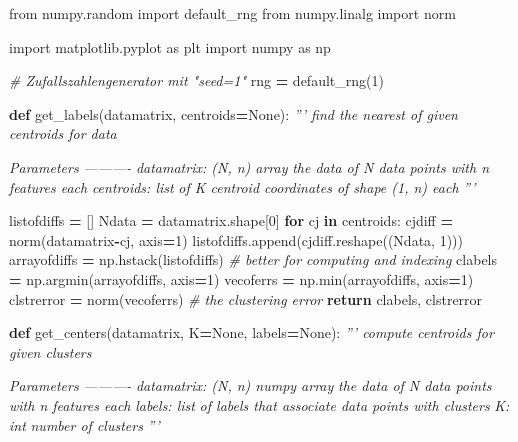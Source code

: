 \documentclass[]{book}
\newenvironment{Shaded}{\begin{snugshade}}{\end{snugshade}}
\newcommand{\BuiltInTok}[1]{#1}
\newcommand{\CommentTok}[1]{\textcolor[rgb]{0.56,0.35,0.01}{\textit{#1}}}
\newcommand{\ControlFlowTok}[1]{\textcolor[rgb]{0.13,0.29,0.53}{\textbf{#1}}}
\newcommand{\DecValTok}[1]{\textcolor[rgb]{0.00,0.00,0.81}{#1}}
\newcommand{\ImportTok}[1]{#1}
\newcommand{\KeywordTok}[1]{\textcolor[rgb]{0.13,0.29,0.53}{\textbf{#1}}}
\newcommand{\NormalTok}[1]{#1}
\newcommand{\OperatorTok}[1]{\textcolor[rgb]{0.81,0.36,0.00}{\textbf{#1}}}
\newcommand{\VariableTok}[1]{\textcolor[rgb]{0.00,0.00,0.00}{#1}}
\theoremstyle{definition}
\theoremstyle{definition}
\theoremstyle{definition}
\theoremstyle{definition}
\theoremstyle{remark}
\begin{document}
\begin{Shaded}
\begin{Highlighting}[]
\ImportTok{from}\NormalTok{ numpy.random }\ImportTok{import}\NormalTok{ default_rng}
\ImportTok{from}\NormalTok{ numpy.linalg }\ImportTok{import}\NormalTok{ norm}

\ImportTok{import}\NormalTok{ matplotlib.pyplot }\ImportTok{as}\NormalTok{ plt}
\ImportTok{import}\NormalTok{ numpy }\ImportTok{as}\NormalTok{ np}

\CommentTok{# Zufallszahlengenerator mit "seed=1"}
\NormalTok{rng }\OperatorTok{=}\NormalTok{ default_rng(}\DecValTok{1}\NormalTok{)}


\KeywordTok{def}\NormalTok{ get_labels(datamatrix, centroids}\OperatorTok{=}\VariableTok{None}\NormalTok{):}
    \CommentTok{''' find the nearest of given centroids for data}

\CommentTok{    Parameters}
\CommentTok{    ----------}
\CommentTok{    datamatrix: (N, n) array}
\CommentTok{        the data of N data points with n features each}
\CommentTok{    centroids: list}
\CommentTok{        of K centroid coordinates of shape (1, n) each}
\CommentTok{    '''}

\NormalTok{    listofdiffs }\OperatorTok{=}\NormalTok{ []}
\NormalTok{    Ndata }\OperatorTok{=}\NormalTok{ datamatrix.shape[}\DecValTok{0}\NormalTok{]}
    \ControlFlowTok{for}\NormalTok{ cj }\KeywordTok{in}\NormalTok{ centroids:}
\NormalTok{        cjdiff }\OperatorTok{=}\NormalTok{ norm(datamatrix}\OperatorTok{-}\NormalTok{cj, axis}\OperatorTok{=}\DecValTok{1}\NormalTok{)}
\NormalTok{        listofdiffs.append(cjdiff.reshape((Ndata, }\DecValTok{1}\NormalTok{)))}
\NormalTok{    arrayofdiffs }\OperatorTok{=}\NormalTok{ np.hstack(listofdiffs)  }\CommentTok{# better for computing and indexing}
\NormalTok{    clabels }\OperatorTok{=}\NormalTok{ np.argmin(arrayofdiffs, axis}\OperatorTok{=}\DecValTok{1}\NormalTok{)}
\NormalTok{    vecoferrs }\OperatorTok{=}\NormalTok{ np.}\BuiltInTok{min}\NormalTok{(arrayofdiffs, axis}\OperatorTok{=}\DecValTok{1}\NormalTok{)}
\NormalTok{    clstrerror }\OperatorTok{=}\NormalTok{ norm(vecoferrs)  }\CommentTok{# the clustering error}
    \ControlFlowTok{return}\NormalTok{ clabels, clstrerror}


\KeywordTok{def}\NormalTok{ get_centers(datamatrix, K}\OperatorTok{=}\VariableTok{None}\NormalTok{, labels}\OperatorTok{=}\VariableTok{None}\NormalTok{):}
    \CommentTok{''' compute centroids for given clusters}

\CommentTok{    Parameters}
\CommentTok{    ----------}
\CommentTok{    datamatrix: (N, n) numpy array}
\CommentTok{        the data of N data points with n features each}
\CommentTok{    labels: list}
\CommentTok{        of labels that associate data points with clusters}
\CommentTok{    K: int}
\CommentTok{        number of clusters}
\CommentTok{    '''}


\end{Highlighting}
\end{Shaded}
\end{document}
